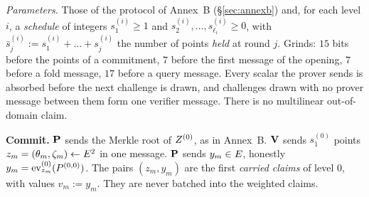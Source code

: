 \begin{protocol}\label{prot:D}
\emph{Parameters.} Those of the protocol of Annex~B (\S\ref{sec:annexb}) and, for each level $i$, a \emph{schedule} of integers $s^{(i)}_1\ge1$ and $s^{(i)}_2,\dots,s^{(i)}_{\ell_i}\ge0$, with $\bar s^{(i)}_j:=s^{(i)}_1+\dots+s^{(i)}_j$ the number of points \emph{held} at round $j$. Grinds: $15$ bits before the points of a commitment, $7$ before the first message of the opening, $7$ before a fold message, $17$ before a query message. Every scalar the prover sends is absorbed before the next challenge is drawn, and challenges drawn with no prover message between them form one verifier message. There is no multilinear out-of-domain claim.

\smallskip\noindent\textbf{Commit.} $\mathbf{P}$ sends the Merkle root of $Z^{(0)}$, as in Annex~B. $\mathbf{V}$ sends $s^{(0)}_1$ points $z_m=(\theta_m,\zeta_m)\leftarrow E^2$ in one message. $\mathbf{P}$ sends $y_m\in E$, honestly $y_m=\operatorname{ev}^{(0)}_{z_m}(P^{(0,0)})$. The pairs $(z_m,y_m)$ are the first \emph{carried claims} of level $0$, with values $v_m:=y_m$. They are never batched into the weighted claims.


\end{protocol}
